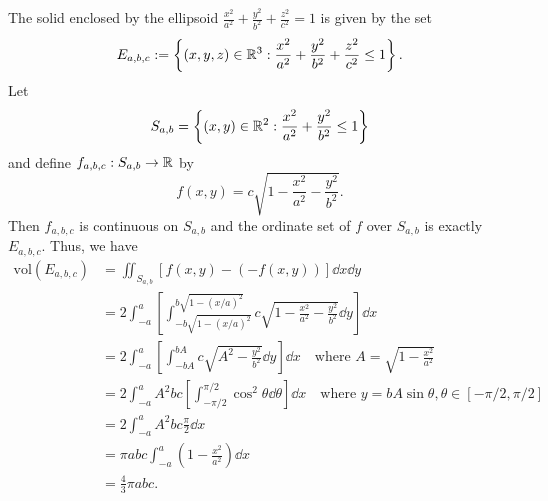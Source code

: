 \begin{exampleenv}\label{ex:vol of ellipsoid}
    The solid enclosed by the ellipsoid $\displaystyle \frac{x^2}{a^2} + \frac{y^2}{b^2} + \frac{z^2}{c^2} = 1$ is given by the set
    $$
    E_{a,b,c} := \left\{(x,y,z) \in \mathbb{R}^3 : \frac{x^2}{a^2} + \frac{y^2}{b^2} + \frac{z^2}{c^2} \leq 1\right\}.
    $$
    Let
    $$S_{a,b} = \left\{(x,y) \in \mathbb{R}^2 : \frac{x^2}{a^2} + \frac{y^2}{b^2} \leq 1\right\}$$
    and define $f_{a,b,c}: S_{a,b} \to \mathbb{R}$ by
    $$
    f(x,y) = c \sqrt{1 - \frac{x^2}{a^2} - \frac{y^2}{b^2}}.
    $$
    Then $f_{a,b,c}$ is continuous on $S_{a,b}$ and the ordinate set of $f$ over $S_{a,b}$ is exactly $E_{a,b,c}$. Thus, we have
    \[
    \begin{aligned}
        \text{vol}(E_{a,b,c}) &= \iint_{S_{a,b}} \left[ f(x,y) - (-f(x,y)) \right] \dd x \dd y\\
        &= 2 \int_{-a}^a \left[ \int_{-b \sqrt{1-(x/a)^2}}^{b \sqrt{1-(x/a)^2}} c \sqrt{1 - \frac{x^2}{a^2} - \frac{y^2}{b^2}} \dd y \right] \dd x\\
        &= 2 \int_{-a}^a \left[ \int_{-bA}^{bA} c \sqrt{A^2 - \frac{y^2}{b^2}} \dd y \right] \dd x \quad \text{where } A = \sqrt{1 - \frac{x^2}{a^2}}\\
        &= 2 \int_{-a}^a A^2bc \left[ \int_{-\pi/2}^{\pi/2} \cos^2 \theta \dd \theta \right] \dd x \quad \text{where } y = bA \sin \theta,\theta \in [-\pi/2, \pi/2]\\
        &= 2 \int_{-a}^a A^2bc \frac{\pi}{2} \dd x \\
        &= \pi abc \int_{-a}^a \left(1 - \frac{x^2}{a^2}\right) \dd x\\
        &= \frac{4}{3} \pi abc.
    \end{aligned}
    \]
\end{exampleenv}
